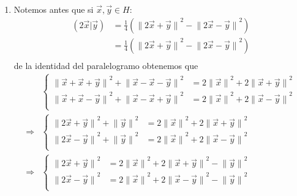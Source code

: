 \documentclass[12pt]{report}
\theoremstyle{largebreak}
\newcommand\pint[2]{\ensuremath{\left(#1\big|#2\right)}}
\newcommand\norm[1]{\ensuremath{\|#1\|}}
\begin{document}
\begin{sol}
\begin{enumerate}
\begin{enumerate}
            \item Notemos antes que si $\vec{x},\vec{y}\in H$:
                \begin{equation*}
                    \begin{split}
                        \pint{2\vec{x}}{\vec{y}}&=\frac{1}{4}\left(\norm{2\vec{x}+\vec{y}}^2-\norm{2\vec{x}-\vec{y}}^2 \right) \\
                        &=\frac{1}{4}\left(\norm{2\vec{x}+\vec{y}}^2-\norm{2\vec{x}-\vec{y}}^2 \right) \\
                    \end{split}
                \end{equation*}
                de la identidad del paralelogramo obtenemos que
                \begin{equation*}
                    \begin{split}
                        &\left\{
                            \begin{array}{rl}
                                \norm{\vec{x}+\vec{x}+\vec{y}}^2+\norm{\vec{x}-\vec{x}-\vec{y}}^2&=2\norm{\vec{x}}^2+2\norm{\vec{x}+\vec{y}}^2\\
                                \norm{\vec{x}+\vec{x}-\vec{y}}^2+\norm{\vec{x}-\vec{x}+\vec{y}}^2&=2\norm{\vec{x}}^2+2\norm{\vec{x}-\vec{y}}^2\\
                            \end{array}
                        \right.\\
                        \Rightarrow&\left\{
                            \begin{array}{rl}
                                \norm{2\vec{x}+\vec{y}}^2+\norm{\vec{y}}^2&=2\norm{\vec{x}}^2+2\norm{\vec{x}+\vec{y}}^2\\
                                \norm{2\vec{x}-\vec{y}}^2+\norm{\vec{y}}^2&=2\norm{\vec{x}}^2+2\norm{\vec{x}-\vec{y}}^2\\
                            \end{array}
                        \right.\\
                        \Rightarrow&\left\{
                            \begin{array}{rl}
                                \norm{2\vec{x}+\vec{y}}^2&=2\norm{\vec{x}}^2+2\norm{\vec{x}+\vec{y}}^2-\norm{\vec{y}}^2\\
                                \norm{2\vec{x}-\vec{y}}^2&=2\norm{\vec{x}}^2+2\norm{\vec{x}-\vec{y}}^2-\norm{\vec{y}}^2\\

\end{array}
\end{split}
\end{equation*}
\end{enumerate}
\end{enumerate}
\end{sol}
\end{document}
